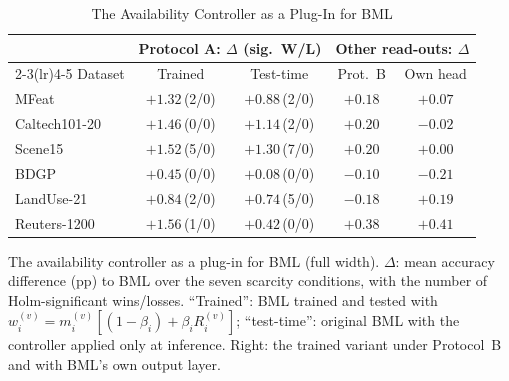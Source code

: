 \begin{table}[!t]
\caption{The Availability Controller as a Plug-In for BML}
\label{tab:plugin}
\centering
\footnotesize
\setlength{\tabcolsep}{2.5pt}
\begin{tabular}{lcccc}
\toprule
& \multicolumn{2}{c}{Protocol A: $\Delta$ (sig.\ W/L)} & \multicolumn{2}{c}{Other read-outs: $\Delta$} \\
\cmidrule(lr){2-3}\cmidrule(lr){4-5}
Dataset & Trained & Test-time & Prot.\ B & Own head \\
\midrule
MFeat & $+1.32$\,(2/0) & $+0.88$\,(2/0) & $+0.18$ & $+0.07$ \\
Caltech101-20 & $+1.46$\,(0/0) & $+1.14$\,(2/0) & $+0.20$ & $-0.02$ \\
Scene15 & $+1.52$\,(5/0) & $+1.30$\,(7/0) & $+0.20$ & $+0.00$ \\
BDGP & $+0.45$\,(0/0) & $+0.08$\,(0/0) & $-0.10$ & $-0.21$ \\
LandUse-21 & $+0.84$\,(2/0) & $+0.74$\,(5/0) & $-0.18$ & $+0.19$ \\
Reuters-1200 & $+1.56$\,(1/0) & $+0.42$\,(0/0) & $+0.38$ & $+0.41$ \\
\bottomrule
\end{tabular}
\par\smallskip
\parbox{\linewidth}{\scriptsize The availability controller as a plug-in for BML (full width). $\Delta$: mean accuracy difference (pp) to BML over the seven scarcity conditions, with the number of Holm-significant wins/losses. ``Trained'': BML trained and tested with $w_i^{(v)}=m_i^{(v)}[(1-\beta_i)+\beta_iR_i^{(v)}]$; ``test-time'': original BML with the controller applied only at inference. Right: the trained variant under Protocol~B and with BML's own output layer.}
\end{table}
